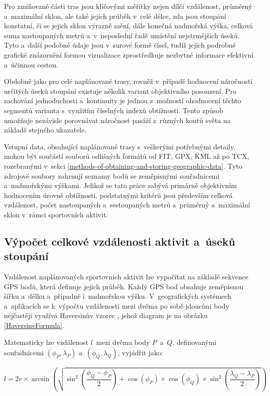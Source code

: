 Pro zmiňované části tras jsou klíčovými měřítky nejen dílčí vzdálenost, průměrný a~maximální sklon, ale také jejich průběh v~celé délce, zda jsou stoupání konstatní, či se jejich sklon výrazně mění, dále konečná nadmořská výška, celková suma nastoupaných metrů a~v~neposlední řadě umístění nejstrmějších úseků.
Tyto a~další podobné údaje jsou v~surové formě čísel, tudíž jejich podrobné grafické znázornění formou vizualizace zprostředkuje nezbytné informace efektivní a~účinnou cestou.

Obdobně jako pro celé naplánované trasy, rovněž v~případě hodnocení náročnosti určitých úseků stoupání existuje několik variant objektivního posouzení.
Pro zachování jednoduchosti a~kontinuity je jednou z~možností ohodnocení těchto segmentů varianta s~využitím číselných indexů obtížnosti.
Tento způsob umožňuje nezávisle porovnávat náročnost pasáží z~různých koutů světa na základě stejného ukazatele.

Vstupní data, obsahující naplánované trasy s~veškerými potřebnými detaily, mohou být součástí souborů odlišných formátů od FIT, GPX, KML až po TCX, rozebranými v~sekci \ref{methods-of-obtaining-and-storing-geographic-data}.
Tyto zdrojové soubory zahrnují seznamy bodů se zeměpisnými souřadnicemi a~nadmořskými výškami.
Jelikož se tato práce zabývá primárně objektivním hodnocením úrovně obtížnosti, podstatnými kritérii jsou především celková vzdálenost, počet nastoupaných a~sestoupaných metrů a~průměrný a~maximální sklon v~rámci sportovních aktivit.

\subsection{Výpočet celkové vzdálenosti aktivit a~úseků stoupání}
\label{calculation-of-total-activity-distances-and-climb-sections}

Vzdálenost naplánovaných sportovních aktivit lze vypočítat na základě sekvence GPS bodů, která definuje jejich průběh.
Každý GPS bod obsahuje zeměpisnou šířku a~délku a~případně i~nadmořskou výšku.
V~geografických systémech a~aplikacích se k~výpočtu vzdálenosti mezi dvěma po sobě jdoucími body nejčastěji využívá Haversinův vzorec \cite{IchramsyahMochamadK2024}, jehož diagram je na obrázku \ref{HaversineFormula}.

Matematicky lze vzdálenost $l$~mezi dvěma body $P$~a~$Q$, definovanými souřadnicemi $(\phi_P, \lambda_P)$ a~$(\phi_Q, \lambda_Q)$, vyjádřit jako:

\[
    l = 2r \times \arcsin \left( \sqrt{\sin^2\left(\frac{\phi_Q - \phi_P}{2}\right) + \cos(\phi_P) \times \cos(\phi_Q) \times \sin^2\left(\frac{\lambda_Q - \lambda_P}{2}\right)} \right)
\]

